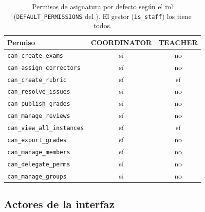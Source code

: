 \begin{table}[htbp]
  \centering
  \small
  \caption{Permisos de asignatura por defecto según el rol (\texttt{DEFAULT\_PERMISSIONS}
           del ). El gestor (\texttt{is\_staff}) los tiene todos.}
  \label{TAB:AN-PERMISSIONS}
  \begin{tabular}{lcc}
    \hline
    \textbf{Permiso} & \textbf{COORDINATOR} & \textbf{TEACHER} \\
    \hline
    \texttt{can\_create\_exams}        & sí & no \\
    \texttt{can\_assign\_correctors}   & sí & no \\
    \texttt{can\_create\_rubric}       & sí & sí \\
    \texttt{can\_resolve\_issues}      & sí & no \\
    \texttt{can\_publish\_grades}      & sí & no \\
    \texttt{can\_manage\_reviews}      & sí & no \\
    \texttt{can\_view\_all\_instances} & sí & sí \\
    \texttt{can\_export\_grades}       & sí & no \\
    \texttt{can\_manage\_members}      & sí & no \\
    \texttt{can\_delegate\_perms}      & sí & no \\
    \texttt{can\_manage\_groups}       & sí & no \\
    \hline
  \end{tabular}
\end{table}

\subsection{Actores de la interfaz}

